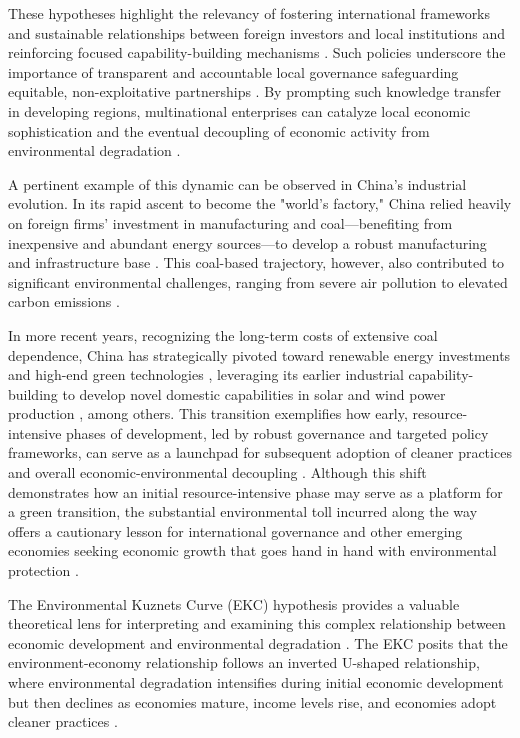 \documentclass[10pt]{article}
\begin{document}
These hypotheses highlight the relevancy of fostering international frameworks and sustainable relationships between foreign investors and local institutions and reinforcing focused capability-building mechanisms \citep{olabisiDesigningEffectivePolicy2024}. Such policies underscore the importance of transparent and accountable local governance safeguarding equitable, non-exploitative partnerships \citep{mudambiGovernmentRegulationCorruption2013}. By prompting such knowledge transfer in developing regions, multinational enterprises can catalyze local economic sophistication and the eventual decoupling of economic activity from environmental degradation \citep{fuMultinationalEnterprisesStructural2021}.

A pertinent example of this dynamic can be observed in China's industrial evolution. In its rapid ascent to become the "world's factory," China relied heavily on foreign firms' investment in manufacturing and coal---benefiting from inexpensive and abundant energy sources---to develop a robust manufacturing and infrastructure base \citep{pengMeasurementDrivingFactors2022, guoAssessingRelationshipForeign2024}. This coal-based trajectory, however, also contributed to significant environmental challenges, ranging from severe air pollution to elevated carbon emissions \citep{ZHOU2019793}.

In more recent years, recognizing the long-term costs of extensive coal dependence, China has strategically pivoted toward renewable energy investments and high-end green technologies \citep{ChinaGreenTechnologies}, leveraging its earlier industrial capability-building to develop novel domestic capabilities in solar and wind power production \citep{wangGreenTechnologyInnovation2019}, among others. This transition exemplifies how early, resource-intensive phases of development, led by robust governance and targeted policy frameworks, can serve as a launchpad for subsequent adoption of cleaner practices and overall economic-environmental decoupling \citep{balsa-barreiroGlobalizationShiftingCenters2019}. Although this shift demonstrates how an initial resource-intensive phase may serve as a platform for a green transition, the substantial environmental toll incurred along the way offers a cautionary lesson for international governance and other emerging economies seeking economic growth that goes hand in hand with environmental protection \citep{vennemoEnvironmentalPollutionChina2009}.

The Environmental Kuznets Curve (EKC) hypothesis provides a valuable theoretical lens for interpreting and examining this complex relationship between economic development and environmental degradation \citep{GrossmanEKCKrueger}. The EKC posits that the environment-economy relationship follows an inverted U-shaped relationship, where environmental degradation intensifies during initial economic development but then declines as economies mature, income levels rise, and economies adopt cleaner practices \citep{paoMultivariateGrangerCausality2011, hanifFossilFuelsForeign2019, leitaoImpactRenewableEnergy2021}.
\end{document}
